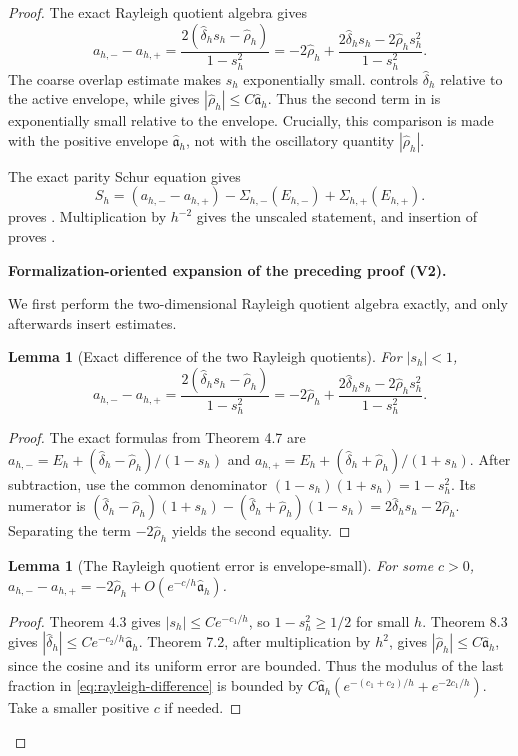 \documentclass[11pt]{article}
\newtheorem{lemma}[theorem]{Lemma}
\newcommand{\formalisationparentid}{X}
\newenvironment{formalisationaddition}[1]{\par\medskip\begingroup\color{blue}\def\formalisationparentid{#1}\setcounter{formalizationsublemma}{0}\let\lemma\formalizationsublemma\let\endlemma\endformalizationsublemma
  \def\Eo{\mathcal E_h^\circ}\def\EE{\mathcal E_h}\def\phio{\phi_h^\circ}\def\phih{\phi_h}\def\Ho{H_h^{\rm atom}(v^\circ)}\def\Ha{H_h^{\rm atom}}\def\HL{H_h^{L}}\def\Dh{D_h}\def\Log{\operatorname{Log}}\def\ellh{\ell_h}\def\Gp{G_{p,h}}\def\Ast{A_{*,h}}\def\ahat{\widehat{\mathfrak a}_h}\def\ah{\mathfrak a_h}\def\rh{\widehat\rho_h}\def\deltah{\widehat\delta_h}\def\oldref##1{\textup{(##1)}}\def\interface##1{\par\noindent\textit{Analytical interface used here.} ##1\par}\def\finish{\par\noindent\textit{Conclusion of the formalization-oriented expansion.} }\par\noindent\textbf{Formalization-oriented expansion of the preceding proof (V2).}\par\smallskip
}{\par\endgroup\medskip
}
\begin{document}
\begin{proof}
The exact Rayleigh quotient algebra gives
\begin{equation}\label{eq:rayleigh-difference}
 a_{h,-}-a_{h,+}
 =\frac{2(\widehat\delta_hs_h-\widehat\rho_h)}{1-s_h^2}
 =-2\widehat\rho_h
 +\frac{2\widehat\delta_hs_h-2\widehat\rho_hs_h^2}{1-s_h^2}.
\end{equation}
The coarse overlap estimate makes $s_h$ exponentially small.  
 controls $\widehat\delta_h$ relative to the active
envelope, while  gives
$|\widehat\rho_h|\le C\widehat{\mathfrak a}_h$.  Thus the second term
in  is exponentially small relative to the
envelope. Crucially, this comparison is made with the positive envelope
$\widehat{\mathfrak a}_h$, not with the oscillatory quantity
$|\widehat\rho_h|$.

The exact parity Schur equation gives
\[
 S_h=(a_{h,-}-a_{h,+})
 -\Sigma_{h,-}(E_{h,-})+\Sigma_{h,+}(E_{h,+}).
\]
 proves
.  Multiplication by $h^{-2}$ gives the unscaled
statement, and insertion of  proves
.

\begin{formalisationaddition}{T8.5}
We first perform the two-dimensional Rayleigh quotient algebra exactly, and only afterwards insert estimates.

\begin{lemma}[Exact difference of the two Rayleigh quotients]\label{sublemma:T8-5-algebra}
For $|s_h|<1$,
\begin{equation*}
 a_{h,-}-a_{h,+}
 =\frac{2(\deltah s_h-\rh)}{1-s_h^2}
 =-2\rh+\frac{2\deltah s_h-2\rh s_h^2}{1-s_h^2}.
\end{equation*}
\end{lemma}
\begin{proof}
The exact formulas from Theorem 4.7 are
$a_{h,-}=E_h+(\deltah-\rh)/(1-s_h)$ and
$a_{h,+}=E_h+(\deltah+\rh)/(1+s_h)$.
After subtraction, use the common denominator $(1-s_h)(1+s_h)=1-s_h^2$. Its numerator is
$(\deltah-\rh)(1+s_h)-(\deltah+\rh)(1-s_h)=2\deltah s_h-2\rh$.
Separating the term $-2\rh$ yields the second equality.
\end{proof}

\begin{lemma}[The Rayleigh quotient error is envelope-small]\label{sublemma:T8-5-rayleigh-error}
For some $c>0$, $a_{h,-}-a_{h,+}=-2\rh+O(e^{-c/h}\ahat)$.
\end{lemma}
\begin{proof}
Theorem 4.3 gives $|s_h|\le Ce^{-c_1/h}$, so $1-s_h^2\ge1/2$ for small $h$. Theorem 8.3 gives $|\deltah|\le Ce^{-c_2/h}\ahat$. Theorem 7.2, after multiplication by $h^2$, gives $|\rh|\le C\ahat$, since the cosine and its uniform error are bounded. Thus the modulus of the last fraction in \eqref{eq:rayleigh-difference} is bounded by
$C\ahat(e^{-(c_1+c_2)/h}+e^{-2c_1/h})$.
Take a smaller positive $c$ if needed.
\end{proof}


\end{formalisationaddition}
\end{proof}
\end{document}

